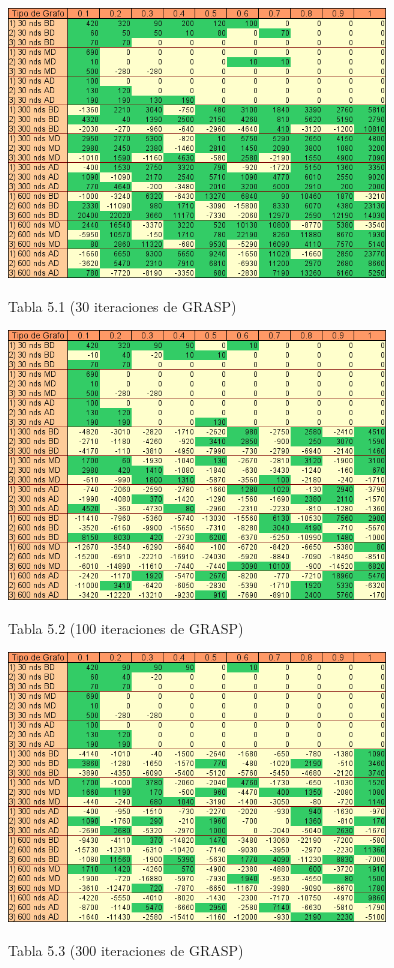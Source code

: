 \documentclass[a4paper,11pt] {article}
\begin{document}
\begin{center}
 \includegraphics[width=0.75\textwidth]{tablas/tablaGrasp30-1.png}
\begin{center}
Tabla 5.1 (30 iteraciones de GRASP)
\end{center}
\end{center}
\begin{center}
 \includegraphics[width=0.75\textwidth]{tablas/tablaGrasp100-1.png}
\begin{center}
Tabla 5.2 (100 iteraciones de GRASP)
\end{center}
\end{center}
\begin{center}
 \includegraphics[width=0.75\textwidth]{tablas/tablaGrasp300-1.png}
\begin{center}
Tabla 5.3 (300 iteraciones de GRASP)
\end{center}
\end{center}
\end{document}
